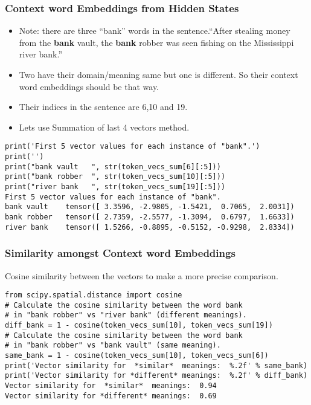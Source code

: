 \begin{frame}[fragile]\frametitle{Context word Embeddings from Hidden States}

\begin{itemize}
\item Note: there are three ``bank'' words in the sentence.``After stealing money from the {\bf bank} vault, the {\bf bank} robber was seen fishing on the Mississippi river bank.''
\item Two have their domain/meaning same but one is different. So their context word embeddings should be that way.
\item Their indices in the sentence are 6,10 and 19.
\item Lets use Summation of last 4 vectors method.
\end{itemize}

\begin{lstlisting}
print('First 5 vector values for each instance of "bank".')
print('')
print("bank vault   ", str(token_vecs_sum[6][:5]))
print("bank robber  ", str(token_vecs_sum[10][:5]))
print("river bank   ", str(token_vecs_sum[19][:5]))
First 5 vector values for each instance of "bank".
bank vault    tensor([ 3.3596, -2.9805, -1.5421,  0.7065,  2.0031])
bank robber   tensor([ 2.7359, -2.5577, -1.3094,  0.6797,  1.6633])
river bank    tensor([ 1.5266, -0.8895, -0.5152, -0.9298,  2.8334])
\end{lstlisting}
\end{frame}

\begin{frame}[fragile]\frametitle{Similarity amongst Context word Embeddings}

Cosine similarity between the vectors to make a more precise comparison.

\begin{lstlisting}
from scipy.spatial.distance import cosine
# Calculate the cosine similarity between the word bank 
# in "bank robber" vs "river bank" (different meanings).
diff_bank = 1 - cosine(token_vecs_sum[10], token_vecs_sum[19])
# Calculate the cosine similarity between the word bank
# in "bank robber" vs "bank vault" (same meaning).
same_bank = 1 - cosine(token_vecs_sum[10], token_vecs_sum[6])
print('Vector similarity for  *similar*  meanings:  %.2f' % same_bank)
print('Vector similarity for *different* meanings:  %.2f' % diff_bank)
Vector similarity for  *similar*  meanings:  0.94
Vector similarity for *different* meanings:  0.69
\end{lstlisting}
\end{frame}

